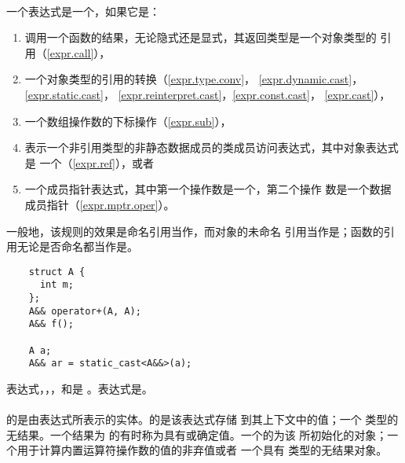 \paragraph{} %
\begin{note}
  一个表达式是一个\xvalue{}，如果它是：
  \begin{enumerate}
    \item 调用一个函数的结果，无论隐式还是显式，其返回类型是一个对象类型的
          \rvalue{}引用（\ref{expr.call}），
    \item 一个对象类型的\rvalue{}引用的转换（\ref{expr.type.conv}，
          \ref{expr.dynamic.cast}，\ref{expr.static.cast}，
          \ref{expr.reinterpret.cast}，\ref{expr.const.cast}，
          \ref{expr.cast}），
    \item 一个\xvalue{}数组操作数的下标操作（\ref{expr.sub}），
    \item 表示一个非引用类型的非静态数据成员的类成员访问表达式，其中对象表达式是
          一个\xvalue{}（\ref{expr.ref}），或者
    \item 一个成员指针表达式，其中第一个操作数是一个\xvalue{}，第二个操作
          数是一个数据成员指针（\ref{expr.mptr.oper}）。
  \end{enumerate}
  一般地，该规则的效果是命名\rvalue{}引用当作\lvalue{}，而对象的未命名\rvalue{}
  引用当作是\xvalue{}；函数的\rvalue{}引用无论是否命名都当作是\lvalue{}。
\end{note}

\begin{example}
  \begin{lstlisting}
    struct A {
      int m;
    };
    A&& operator+(A, A);
    A&& f();

    A a;
    A&& ar = static_cast<A&&>(a);
  \end{lstlisting}
  表达式，，，和是
  \xvalue{}。表达式是\lvalue{}。
\end{example}

\paragraph{} %
\glvalue{}的是由表达式所表示的实体。\prvalue{}的是该表达式存储
到其上下文中的值；一个 类型的\prvalue{}无结果。一个结果为
的\prvalue{}有时称为具有或确定值。一个\prvalue{}的为该
\prvalue{}所初始化的对象；一个用于计算内置运算符操作数的值的非弃值\prvalue{}或者
一个具有 类型的\prvalue{}无结果对象。

